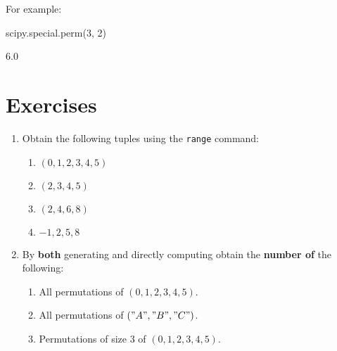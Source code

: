 For example:

\begin{pyin}
scipy.special.perm(3, 2)
\end{pyin}





\begin{raw}
6.0
\end{raw}







\section{Exercises}
\begin{enumerate}

\item 

Obtain the following tuples using the \texttt{range} command:
\begin{enumerate}

\item 

\((0, 1, 2, 3, 4, 5)\)

\item 

\((2, 3, 4, 5)\)

\item 

\((2, 4, 6, 8)\)

\item 

\(-1, 2, 5, 8\)

\end{enumerate}

\item 

By \textbf{both} generating and directly computing obtain the \textbf{number of} the following:
\begin{enumerate}

\item 

All permutations of \((0, 1, 2, 3, 4, 5)\).

\item 

All permutations of \(("A", "B", "C")\).

\item 

Permutations of size 3 of \((0, 1, 2, 3, 4, 5)\).


\end{enumerate}
\end{enumerate}
